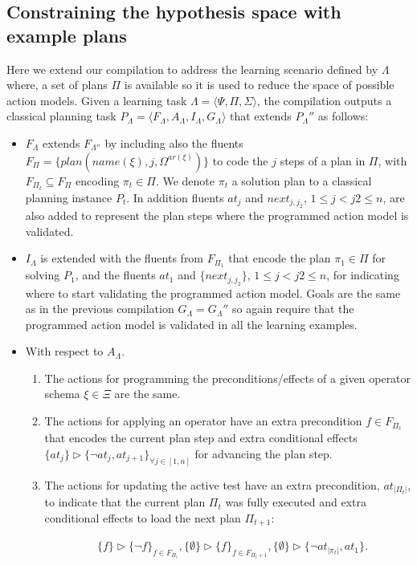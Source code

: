 \documentclass[letterpaper]{article} %
\newcommand{\tup}[1]{{\langle #1 \rangle}}
\begin{document}
\subsection{Constraining the hypothesis space with example plans}
Here  we extend our compilation to address the learning scenario defined by $\Lambda$ where, a set of plans $\Pi$ is available so it is used to reduce the space of possible action models. Given a learning task $\Lambda=\tup{\Psi,\Pi,\Sigma}$, the compilation outputs a classical planning task $P_{\Lambda}=\tup{F_{\Lambda},A_{\Lambda},I_{\Lambda},G_{\Lambda}}$ that extends $P_{\Lambda}''$ as follows: 
\begin{itemize}
\item $F_{\Lambda}$ extends $F_{\Lambda''}$ by including also the fluents $F_{\Pi}=\{plan(name(\xi),j,\Omega^{ar(\xi)})\}$ to code the $j$ steps of a plan in $\Pi$, with $F_{\Pi_t}\subseteq F_{\Pi}$ encoding $\pi_t\in \Pi$. We denote $\pi_t$ a solution plan to a classical planning instance $P_t$. In addition fluents $at_j$ and $next_{j,j_2}$, {\small $1\leq j<j2\leq n$}, are also added to represent the plan steps where the programmed action model is validated.
\item $I_{\Lambda}$ is extended with the fluents from $F_{\Pi_1}$ that encode the plan $\pi_1\in \Pi$ for solving $P_1$, and the fluents $at_1$ and $\{next_{j,j_2}\}$, {\small $1\leq j<j2\leq n$}, for indicating where to start validating the programmed action model. Goals are the same as in the previous compilation $G_{\Lambda}=G_{\Lambda}''$ so again require that the programmed action model is validated in all  the learning examples.
\item With respect to $A_{\Lambda}$.
\begin{enumerate}
\item The actions for programming the preconditions/effects of a given operator schema $\xi\in\Xi$ are the same.
\item The actions for applying an operator have an extra precondition $f\in F_{\Pi_t}$ that encodes the current plan step and extra conditional effects $\{at_{j}\}\rhd\{\neg at_{j},at_{j+1}\}_{\forall j\in [1,n]}$ for advancing the plan step.
\item The actions for updating the active test have an extra precondition, $at_{|\Pi_t|}$, to indicate that the current plan $\Pi_t$ was fully executed and extra conditional effects to load the next plan $\Pi_{t+1}$:
\begin{small}
\begin{align*}
&\{f\}\rhd\{\neg f\}_{f\in F_{\Pi_t}}, \{\emptyset\}\rhd\{f\}_{f\in F_{\Pi_t+1}},\{\emptyset\}\rhd\{\neg at_{|\pi_t|},at_1\}.
\end{align*}
\end{small}
\end{enumerate}
\end{itemize}
\end{document}
